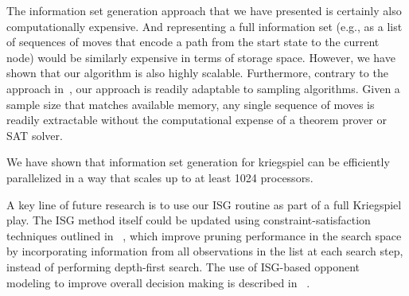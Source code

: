 \documentclass[times, 10pt,twocolumn]{article}
\begin{document}
The information set generation approach that we have presented is certainly also computationally expensive.  And
representing a full information set (e.g., as a list of sequences of moves that encode a path from the start state to
the current node) would be similarly expensive in terms of storage space.  However, we have shown that our algorithm is
also highly scalable.  Furthermore, contrary to the approach in~\cite{nance06reasoning}, our approach is readily
adaptable to sampling algorithms.  Given a sample size that matches available memory, any single sequence of moves is
readily extractable without the computational expense of a theorem prover or SAT solver.

We have shown that information set generation for kriegspiel can be efficiently parallelized in a way that scales up to at least 1024 processors.

A key line of future research is to use our ISG routine as part of a full Kriegspiel play.  The ISG method itself could be updated using constraint-satisfaction techniques outlined in ~\cite{richards12information}, which improve pruning performance in the search space by incorporating information from all observations in the list at each search step, instead of performing depth-first search.   The use of ISG-based opponent modeling to improve overall decision making is described in ~\cite{richards12reasoning}. 

\end{document}
